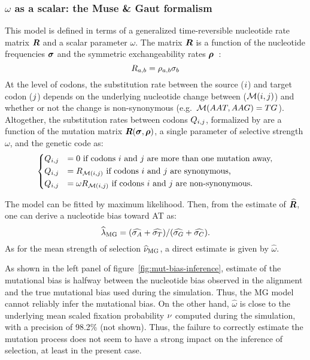 \subsubsection{\texorpdfstring{$\omega$}{ω} as a scalar: the Muse \& Gaut formalism}
This model is defined in terms of a generalized time-reversible nucleotide rate matrix $\bm{R}$ and a scalar parameter $\omega$.
The matrix $\bm{R}$ is a function of the nucleotide frequencies $\bm{\sigma}$ and the symmetric exchangeability rates $\bm{\rho}$~\citep{Tavare1986}:
\begin{equation}
    R_{a, b} = \rho_{a,b}\sigma_b
\end{equation}
At the level of codons, the substitution rate between the source (${i}$) and target codon (${j}$) depends on the underlying nucleotide change between ($\mathcal{M}({i}, {j})$) and whether or not the change is non-synonymous (e.g.~$\mathcal{M}(AAT, AAG) = TG$).
Altogether, the substitution rates between codons $Q_{{i}, {j}}$, formalized by \citet{Muse1994} are a function of the mutation matrix $\bm{R}(\bm{\sigma}, \bm{\rho})$, a single parameter of selective strength $\omega$, and the genetic code as:
\begin{equation}
    \begin{dcases}
        Q_{{i}, {j}} & = 0 \text{ if codons ${i}$ and ${j}$ are more than one mutation away,} \\
        Q_{{i}, {j}} & = R_{\mathcal{M}({i}, {j})} \text{ if codons ${i}$ and ${j}$ are synonymous,} \\
        Q_{{i}, {j}} & = \omega R_{\mathcal{M}({i}, {j})} \text{ if codons ${i}$ and ${j}$ are non-synonymous}.
    \end{dcases}
    \label{eq:codon-muse-gaut}
\end{equation}

The model can be fitted by maximum likelihood.
Then, from the estimate of $\widehat{\bm{R}}$, one can derive a nucleotide bias toward AT as:
\begin{equation}
    \widehat{\lambda}_{\text{MG}} = (\widehat{\sigma_A} +\widehat{\sigma_T}) /(\widehat{\sigma_G} +\widehat{\sigma_C}).\label{eq:lambda-R}
\end{equation}
As for the mean strength of selection $\widehat{\nu}_{\text{MG}}$, a direct estimate is given by $\widehat{\omega}$.

As shown in the left panel of figure~\ref{fig:mut-bias-inference}, estimate of the mutational bias is halfway between the nucleotide bias observed in the alignment and the true mutational bias used during the simulation.
Thus, the MG model cannot reliably infer the mutational bias.
On the other hand, $\widehat{\omega}$ is close to the underlying mean scaled fixation probability $\nu$ computed during the simulation, with a precision of 98.2\% (not shown).
Thus, the failure to correctly estimate the mutation process does not seem to have a strong impact on the inference of selection, at least in the present case.

